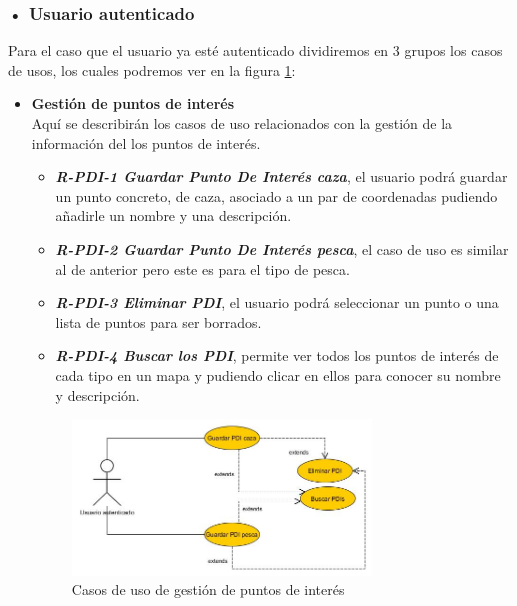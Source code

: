 \subsubsection{• Usuario  autenticado}

Para el caso que el usuario ya esté autenticado dividiremos en 3 grupos los casos de usos, los cuales podremos ver en la figura \ref{fig:PDI}:
\begin{itemize}
\item \textbf{Gestión de puntos de interés}\\
Aquí se describirán los casos de uso relacionados con la gestión  de la información del los puntos de interés.
\begin{itemize}
\item\textbf{\textit{ R-PDI-1 Guardar Punto De Interés caza}}, el usuario podrá guardar un punto concreto, de caza, asociado a un par de coordenadas pudiendo añadirle un nombre y una descripción.
\item\textit{ \textbf{R-PDI-2 Guardar Punto De Interés pesca}}, el caso de uso es similar al de anterior pero este es para el tipo de pesca.
\item \textbf{\textit{R-PDI-3 Eliminar PDI}}, el usuario podrá seleccionar un punto o una lista de puntos para ser borrados.
\item \textbf{\textit{R-PDI-4 Buscar los PDI}}, permite ver todos los puntos de interés de cada tipo en un mapa y pudiendo clicar en ellos para conocer su nombre y descripción.
\end{itemize} 

\begin{figure}[H]
		\centering
		\includegraphics[width=0.75\textwidth] {PDI.jpg}
		\caption{Casos de uso de gestión de puntos de interés }\label{fig:PDI}
	\end{figure}
	
	
	

\end{itemize}
